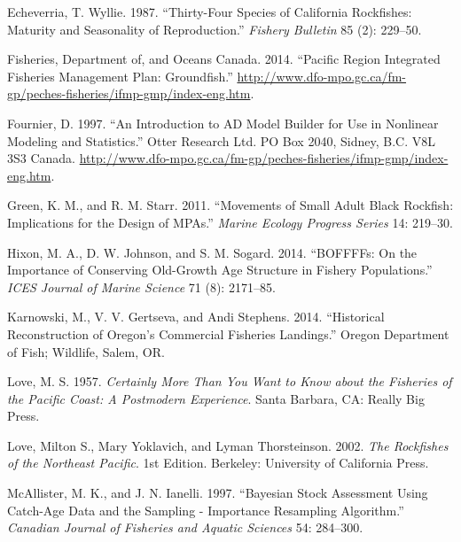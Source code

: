 \documentclass[11pt,
  english,
  letterpaper,
]{article}
\newlength{\cslhangindent}
\newenvironment{CSLReferences}[2] %
 {%
  \setlength{\parindent}{0pt}
  \ifodd #1 \everypar{\setlength{\hangindent}{\cslhangindent}}\ignorespaces\fi
  \ifnum #2 > 0
  \setlength{\parskip}{#2\baselineskip}
  \fi
 }%
 {}
\begin{document}
\begin{CSLReferences}{1}{0}
\leavevmode{}%
Echeverria, T. Wyllie. 1987. {``Thirty-Four Species of California Rockfishes: Maturity and Seasonality of Reproduction.''} \emph{Fishery Bulletin} 85 (2): 229--50.

\leavevmode{}%
Fisheries, Department of, and Oceans Canada. 2014. {``Pacific Region Integrated Fisheries Management Plan: Groundfish.''} \url{http://www.dfo-mpo.gc.ca/fm-gp/peches-fisheries/ifmp-gmp/index-eng.htm}.

\leavevmode{}%
Fournier, D. 1997. {``An Introduction to AD Model Builder for Use in Nonlinear Modeling and Statistics.''} Otter Research Ltd. PO Box 2040, Sidney, B.C. V8L 3S3 Canada. \url{http://www.dfo-mpo.gc.ca/fm-gp/peches-fisheries/ifmp-gmp/index-eng.htm}.

\leavevmode{}%
Green, K. M., and R. M. Starr. 2011. {``Movements of Small Adult Black Rockfish: Implications for the Design of MPAs.''} \emph{Marine Ecology Progress Series} 14: 219--30.

\leavevmode{}%
Hixon, M. A., D. W. Johnson, and S. M. Sogard. 2014. {``BOFFFFs: On the Importance of Conserving Old-Growth Age Structure in Fishery Populations.''} \emph{ICES Journal of Marine Science} 71 (8): 2171--85.

\leavevmode{}%
Karnowski, M., V. V. Gertseva, and Andi Stephens. 2014. {``Historical {Reconstruction} of {Oregon}'s {Commercial} {Fisheries} {Landings}.''} Oregon Department of Fish; Wildlife, Salem, OR.

\leavevmode{}%
Love, M. S. 1957. \emph{Certainly More Than You Want to Know about the Fisheries of the Pacific Coast: A Postmodern Experience}. Santa Barbara, CA: Really Big Press.

\leavevmode{}%
Love, Milton S., Mary Yoklavich, and Lyman Thorsteinson. 2002. \emph{The Rockfishes of the Northeast Pacific}. 1st Edition. Berkeley: University of California Press.

\leavevmode{}%
McAllister, M. K., and J. N. Ianelli. 1997. {``Bayesian Stock Assessment Using Catch-Age Data and the Sampling - Importance Resampling Algorithm.''} \emph{Canadian Journal of Fisheries and Aquatic Sciences} 54: 284--300.


\end{CSLReferences}
\end{document}
